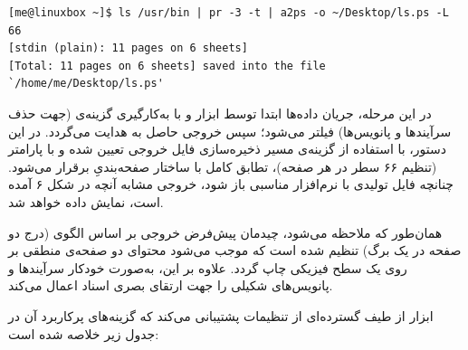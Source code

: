 \begin{latin}
\begin{lstlisting}
[me@linuxbox ~]$ ls /usr/bin | pr -3 -t | a2ps -o ~/Desktop/ls.ps -L 66
[stdin (plain): 11 pages on 6 sheets]
[Total: 11 pages on 6 sheets] saved into the file `/home/me/Desktop/ls.ps'
\end{lstlisting}
\end{latin}

در این مرحله، جریان داده‌ها ابتدا توسط ابزار  و با به‌کارگیری گزینه‌ی  (جهت حذف سرآیند‌ها و پانویس‌ها) فیلتر می‌شود؛ سپس خروجی حاصل به  هدایت می‌گردد. در این دستور، با استفاده از گزینه‌ی  مسیر ذخیره‌سازی فایل خروجی تعیین شده و با پارامتر  (تنظیم ۶۶ سطر در هر صفحه)، تطابق کامل با ساختار صفحه‌بندیِ  برقرار می‌شود. چنانچه فایل تولیدی با نرم‌افزار مناسبی باز شود، خروجی مشابه آنچه در شکل ۶ آمده است، نمایش داده خواهد شد.


همان‌طور که ملاحظه می‌شود، چیدمان پیش‌فرض خروجی بر اساس الگوی  (درج دو صفحه در یک برگ) تنظیم شده است که موجب می‌شود محتوای دو صفحه‌ی منطقی بر روی یک سطح فیزیکی چاپ گردد. علاوه بر این،  به‌صورت خودکار سرآیندها و پانویس‌های شکیلی را جهت ارتقای بصری اسناد اعمال می‌کند.

ابزار  از طیف گسترده‌ای از تنظیمات پشتیبانی می‌کند که گزینه‌های پرکاربرد آن در جدول زیر خلاصه شده است:

